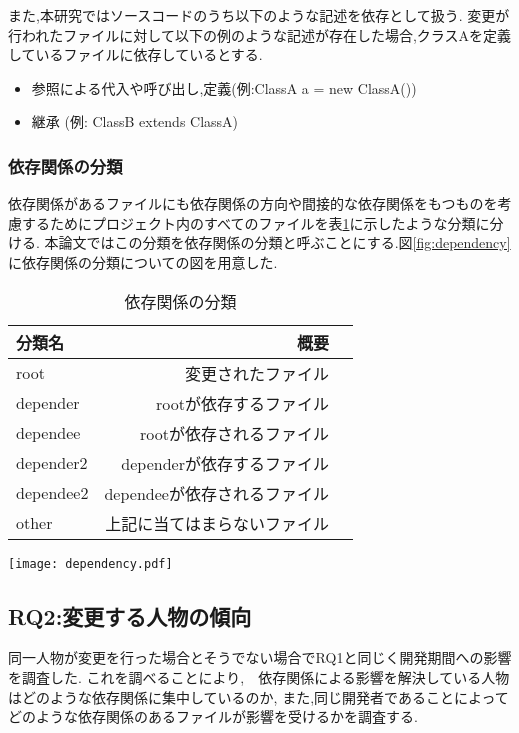 \documentclass[submit,ses,noauthor]{ipsj} %
\begin{document}
また,本研究ではソースコードのうち以下のような記述を依存として扱う.
変更が行われたファイルに対して以下の例のような記述が存在した場合,クラスAを定義しているファイルに依存しているとする.

\begin{itemize}
\item 参照による代入や呼び出し,定義(例:ClassA a = new ClassA())
\item 継承 (例: ClassB extends ClassA)
\end{itemize}

\subsubsection{依存関係の分類}
依存関係があるファイルにも依存関係の方向や間接的な依存関係をもつものを考慮するためにプロジェクト内のすべてのファイルを表\ref{tab:依存関係の分類}に示したような分類に分ける.
本論文ではこの分類を依存関係の分類と呼ぶことにする.図\ref{fig:dependency}に依存関係の分類についての図を用意した.

\begin{table}
\caption{依存関係の分類}
\begin{tabular}{|l|r|r|} \hline
分類名 & 概要 \\ \hline
root & 変更されたファイル \\ \hline
depender & rootが依存するファイル \\ \hline
dependee & rootが依存されるファイル \\ \hline
depender2 & dependerが依存するファイル \\ \hline
dependee2 & dependeeが依存されるファイル \\ \hline
other & 上記に当てはまらないファイル \\ \hline
\end{tabular}
\label{tab:依存関係の分類}
\end{table}

\begin{figure*}[t]
\centering
\texttt{[image: dependency.pdf]}
\caption{依存関係の分類図}
\label{fig:dependency} 
\end{figure*}

\subsection{RQ2:変更する人物の傾向}
同一人物が変更を行った場合とそうでない場合でRQ1と同じく開発期間への影響を調査した.
これを調べることにより,　依存関係による影響を解決している人物はどのような依存関係に集中しているのか,
また,同じ開発者であることによってどのような依存関係のあるファイルが影響を受けるかを調査する.
\end{document}
